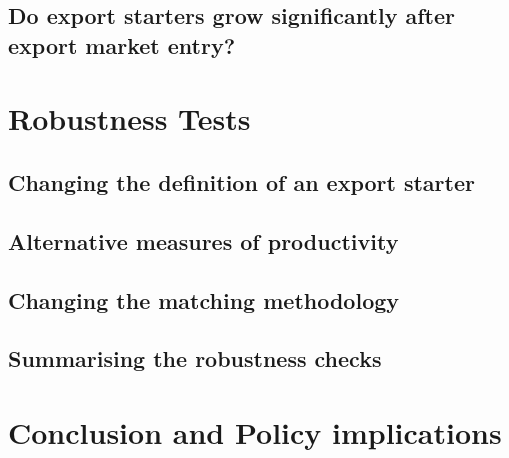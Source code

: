 \documentclass[11pt]{article}
\begin{document}



\subsection{Do export starters grow significantly after export market
  entry?}


\section{Robustness Tests}\label{sec:robustness}


\subsection{Changing the definition of an export starter}




\subsection{Alternative measures of productivity}

\subsection{Changing the matching methodology}


\subsection{Summarising the robustness checks}


\section{Conclusion and Policy implications}\label{sec:conclusion}

\printbibliography
\newpage 

\newpage
\appendix
\end{document}
